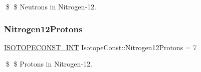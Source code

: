 \$ \$ Neutrons in Nitrogen-\/12. \mbox{\label{group___isotope_const-_nitrogen-_n12_ga7d3a169c50c69fe4e6f7eb248341a14e}} 
\subsubsection{\texorpdfstring{Nitrogen12\+Protons}{Nitrogen12Protons}}
{\footnotesize\ttfamily \mbox{\hyperlink{group___isotope_const-_macros_ga5f18360b3e99483a35c32d789e62621c}{I\+S\+O\+T\+O\+P\+E\+C\+O\+N\+S\+T\+\_\+\+I\+NT}} Isotope\+Const\+::\+Nitrogen12\+Protons = 7}

\$ \$ Protons in Nitrogen-\/12. 